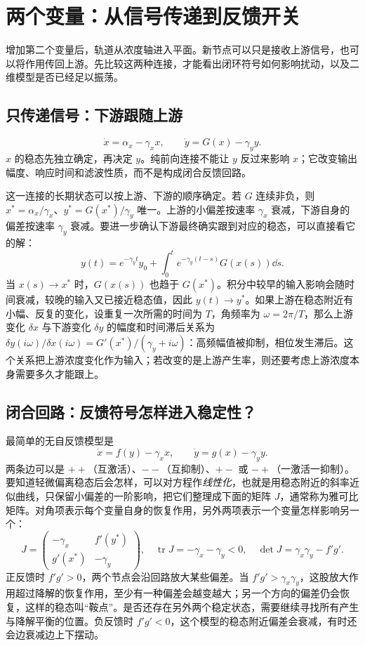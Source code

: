 \chapter{两个变量：从信号传递到反馈开关}
增加第二个变量后，轨道从浓度轴进入平面。新节点可以只是接收上游信号，也可以将作用传回上游。先比较这两种连接，才能看出闭环符号如何影响扰动，以及二维模型是否已经足以振荡。
\section{只传递信号：下游跟随上游}
\begin{equation}\dot x=\alpha_x-\gamma_xx,\qquad\dot y=G(x)-\gamma_yy.\end{equation}
$x$ 的稳态先独立确定，再决定 $y$。纯前向连接不能让 $y$ 反过来影响 $x$；它改变输出幅度、响应时间和滤波性质，而不是构成闭合反馈回路。

这一连接的长期状态可以按上游、下游的顺序确定。若 $G$ 连续非负，则 $x^*=\alpha_x/\gamma_x$、$y^*=G(x^*)/\gamma_y$ 唯一。上游的小偏差按速率 $\gamma_x$ 衰减，下游自身的偏差按速率 $\gamma_y$ 衰减。要进一步确认下游最终确实跟到对应的稳态，可以直接看它的解：
\[
y(t)=e^{-\gamma_yt}y_0+\int_0^t e^{-\gamma_y(t-s)}G(x(s))\dd s.
\]
当 $x(s)\to x^*$ 时，$G(x(s))$ 也趋于 $G(x^*)$。积分中较早的输入影响会随时间衰减，较晚的输入又已接近稳态值，因此 $y(t)\to y^*$。如果上游在稳态附近有小幅、反复的变化，设重复一次所需的时间为 $T$，角频率为 $\omega=2\pi/T$，那么上游变化 $\delta x$ 与下游变化 $\delta y$ 的幅度和时间滞后关系为
$\delta y(i\omega)/\delta x(i\omega)=G'(x^*)/(\gamma_y+i\omega)$：高频幅值被抑制，相位发生滞后。这个关系把上游浓度变化作为输入；若改变的是上游产生率，则还要考虑上游浓度本身需要多久才能跟上。

\section{闭合回路：反馈符号怎样进入稳定性？}
最简单的无自反馈模型是
\begin{equation}\dot x=f(y)-\gamma_xx,\qquad\dot y=g(x)-\gamma_yy.\label{eq:two}\end{equation}
两条边可以是 $++$（互激活）、$--$（互抑制）、$+-$ 或 $-+$（一激活一抑制）。要知道轻微偏离稳态后会怎样，可以对方程作\emph{线性化}，也就是用稳态附近的斜率近似曲线，只保留小偏差的一阶影响，把它们整理成下面的矩阵 $J$，通常称为雅可比矩阵。对角项表示每个变量自身的恢复作用，另外两项表示一个变量怎样影响另一个：
\begin{equation}J=\begin{pmatrix}-\gamma_x&f'(y^*)\\g'(x^*)&-\gamma_y\end{pmatrix},\quad \operatorname{tr}J=-\gamma_x-\gamma_y<0,\quad\det J=\gamma_x\gamma_y-f'g'.\end{equation}
正反馈时 $f'g'>0$，两个节点会沿回路放大某些偏差。当 $f'g'>\gamma_x\gamma_y$，这股放大作用超过降解的恢复作用，至少有一种偏差会越变越大；另一个方向的偏差仍会恢复，这样的稳态叫“鞍点”。是否还存在另外两个稳定状态，需要继续寻找所有产生与降解平衡的位置。负反馈时 $f'g'<0$，这个模型的稳态附近偏差会衰减，有时还会边衰减边上下摆动。

